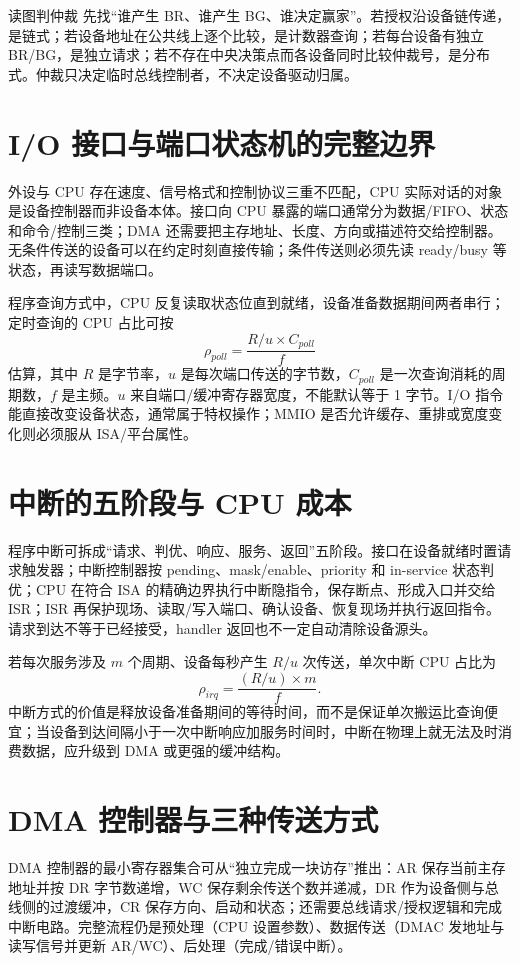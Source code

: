 \documentclass[UTF8,fontset=fandol,11pt,a4paper]{ctexart}
\begin{document}
\begin{methodbox}{读图判仲裁}
先找“谁产生 BR、谁产生 BG、谁决定赢家”。若授权沿设备链传递，是链式；若设备地址在公共线上逐个比较，是计数器查询；若每台设备有独立 BR/BG，是独立请求；若不存在中央决策点而各设备同时比较仲裁号，是分布式。仲裁只决定临时总线控制者，不决定设备驱动归属。
\end{methodbox}

\section{I/O 接口与端口状态机的完整边界}
外设与 CPU 存在速度、信号格式和控制协议三重不匹配，CPU 实际对话的对象是设备控制器而非设备本体。接口向 CPU 暴露的端口通常分为数据/FIFO、状态和命令/控制三类；DMA 还需要把主存地址、长度、方向或描述符交给控制器。无条件传送的设备可以在约定时刻直接传输；条件传送则必须先读 ready/busy 等状态，再读写数据端口。

程序查询方式中，CPU 反复读取状态位直到就绪，设备准备数据期间两者串行；定时查询的 CPU 占比可按
\[
\rho_{poll}=\frac{R/u\times C_{poll}}{f}
\]
估算，其中 $R$ 是字节率，$u$ 是每次端口传送的字节数，$C_{poll}$ 是一次查询消耗的周期数，$f$ 是主频。$u$ 来自端口/缓冲寄存器宽度，不能默认等于 1 字节。I/O 指令能直接改变设备状态，通常属于特权操作；MMIO 是否允许缓存、重排或宽度变化则必须服从 ISA/平台属性。

\section{中断的五阶段与 CPU 成本}
程序中断可拆成“请求、判优、响应、服务、返回”五阶段。接口在设备就绪时置请求触发器；中断控制器按 pending、mask/enable、priority 和 in-service 状态判优；CPU 在符合 ISA 的精确边界执行中断隐指令，保存断点、形成入口并交给 ISR；ISR 再保护现场、读取/写入端口、确认设备、恢复现场并执行返回指令。请求到达不等于已经接受，handler 返回也不一定自动清除设备源头。

若每次服务涉及 $m$ 个周期、设备每秒产生 $R/u$ 次传送，单次中断 CPU 占比为
\[
\rho_{irq}=\frac{(R/u)\times m}{f}.
\]
中断方式的价值是释放设备准备期间的等待时间，而不是保证单次搬运比查询便宜；当设备到达间隔小于一次中断响应加服务时间时，中断在物理上就无法及时消费数据，应升级到 DMA 或更强的缓冲结构。

\section{DMA 控制器与三种传送方式}
DMA 控制器的最小寄存器集合可从“独立完成一块访存”推出：AR 保存当前主存地址并按 DR 字节数递增，WC 保存剩余传送个数并递减，DR 作为设备侧与总线侧的过渡缓冲，CR 保存方向、启动和状态；还需要总线请求/授权逻辑和完成中断电路。完整流程仍是预处理（CPU 设置参数）、数据传送（DMAC 发地址与读写信号并更新 AR/WC）、后处理（完成/错误中断）。
\end{document}
